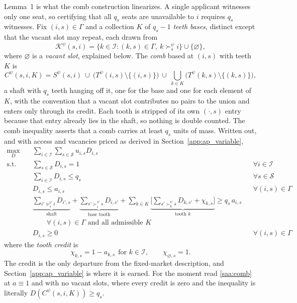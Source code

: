 \documentclass{article}
\begin{document}
Lemma~1 is what the comb construction linearizes. A single applicant witnesses only one seat, so certifying that all $q_s$ seats are unavailable to $i$ requires $q_s$ witnesses. Fix $(i,s) \in \Gamma$ and a collection $K$ of $q_s - 1$ \emph{teeth bases}, distinct except that the vacant slot may repeat, each drawn from
\begin{equation}\label{eq:ap_tooth_bases}
\mathcal{K}^\psi(s,i) = \{k \in \mathcal{I} : (k,s) \in \Gamma, \ k \succ_s^\psi i\} \cup \{\varnothing\},
\end{equation}
where $\varnothing$ is a \emph{vacant slot}, explained below. The \emph{comb} based at $(i,s)$ with teeth $K$ is
\begin{equation}\label{eq:ap_comb_set}
C^\psi(s,i,K) = S^\psi(s,i) \ \cup \ \big(T^\psi(i,s) \setminus \{(i,s)\}\big) \ \cup \ \bigcup_{k \in K} \big(T^\psi(k,s) \setminus \{(k,s)\}\big),
\end{equation}
a shaft with $q_s$ teeth hanging off it, one for the base and one for each element of $K$, with the convention that a vacant slot contributes no pairs to the union and enters only through its credit. Each tooth is stripped of its own $(\cdot,s)$ entry because that entry already lies in the shaft, so nothing is double counted. The comb inequality asserts that a comb carries at least $q_s$ units of mass. Written out, and with access and vacancies priced as derived in Section~\ref{app:ap_variable},
\begin{align}
\max_{D} \quad & \sum_{i \in \mathcal{I}} \sum_{s \in \mathcal{S}} u_{i,s} D_{i,s} \label{saa:primal_obj} \\
\textrm{s.t.} \quad & \sum_{s \in \mathcal{S}} D_{i,s} = 1 && \forall i \in \mathcal{I} \label{saa:assignment} \\
& \sum_{i \in \mathcal{I}} D_{i,s} \leq q_s && \forall s \in \mathcal{S} \label{saa:capacity} \\
& D_{i,s} \leq a_{i,s} && \forall (i,s) \in \Gamma \label{saa:access} \\
& \underbrace{\sum_{i' \succeq_s^\psi i} D_{i', s}}_{\text{shaft}} + \underbrace{\sum_{s' \succ_i^\psi s} D_{i, s'}}_{\text{base tooth}} + \sum_{k \in K} \underbrace{\Big[ \sum_{s' \succ_k^\psi s} D_{k, s'} + \chi_{k,s} \Big]}_{\text{tooth } k} \geq q_s\, a_{i,s} \label{saa:comb} \\
& \qquad \forall (i,s) \in \Gamma \text{ and all admissible } K \nonumber \\
& D_{i,s} \geq 0 && \forall (i,s) \in \Gamma \label{saa:domain}
\end{align}
where the \emph{tooth credit} is
\begin{equation}\label{eq:ap_credit}
\chi_{k,s} = 1 - a_{k,s} \ \ \text{for } k \in \mathcal{I},
\qquad
\chi_{\varnothing,s} = 1 .
\end{equation}
The credit is the only departure from the fixed-market description, and Section~\ref{app:ap_variable} is where it is earned.  For the moment read \eqref{saa:comb} at $a \equiv 1$ and with no vacant slots, where every credit is zero and the inequality is literally $D(C^\psi(s,i,K)) \ge q_s$.
\end{document}
